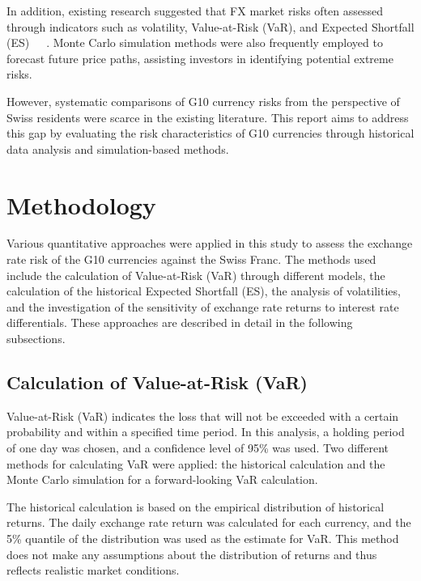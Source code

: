 \documentclass{article}
\begin{document}
In addition, existing research suggested that FX market risks often assessed through indicators such as volatility, Value-at-Risk (VaR), and Expected Shortfall (ES)~\cite{AUBOIN_RUTA_2013}~\cite{dollar_exchange}~\cite{riker2020review}. Monte Carlo simulation methods were also frequently employed to forecast future price paths, assisting investors in identifying potential extreme risks.

However, systematic comparisons of G10 currency risks from the perspective of Swiss residents were scarce in the existing literature. This report aims to address this gap by evaluating the risk characteristics of G10 currencies through historical data analysis and simulation-based methods.

\section{Methodology}

Various quantitative approaches were applied in this study to assess the exchange rate risk of the G10 currencies against the Swiss Franc. The methods used include the calculation of Value-at-Risk (VaR) through different models, the calculation of the historical Expected Shortfall (ES), the analysis of volatilities, and the investigation of the sensitivity of exchange rate returns to interest rate differentials. These approaches are described in detail in the following subsections.

\subsection{Calculation of Value-at-Risk (VaR)}

Value-at-Risk (VaR) indicates the loss that will not be exceeded with a certain probability and within a specified time period. In this analysis, a holding period of one day was chosen, and a confidence level of 95\% was used. Two different methods for calculating VaR were applied: the historical calculation and the Monte Carlo simulation for a forward-looking VaR calculation.

The historical calculation is based on the empirical distribution of historical returns. The daily exchange rate return was calculated for each currency, and the 5\% quantile of the distribution was used as the estimate for VaR. This method does not make any assumptions about the distribution of returns and thus reflects realistic market conditions.
\end{document}
